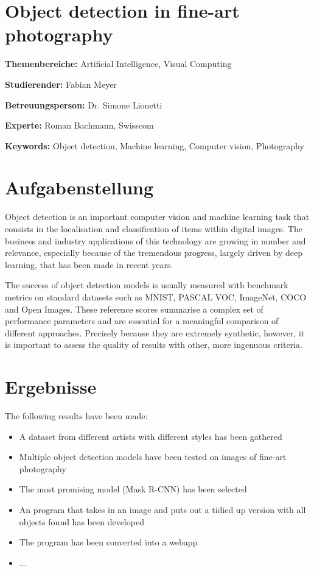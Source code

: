 \documentclass[a4paper,10pt,hidelinks]{scrartcl}
\begin{document}
\section*{\fontsize{18}{20}\selectfont Object detection in fine-art photography}
\thispagestyle{firstpage}

\textbf{Themenbereiche:} \tabto{4cm} Artificial Intelligence, Visual Computing

\noindent
\textbf{Studierender:} \tabto{4cm} Fabian Meyer

\noindent
\textbf{Betreuungsperson:} \tabto{4cm} Dr. Simone Lionetti

\noindent
\textbf{Experte:} \tabto{4cm} Roman Bachmann, Swisscom

\noindent
\textbf{Keywords:} \tabto{4cm} Object detection, Machine learning, Computer vision, Photography

\section{\fontsize{14}{16}\selectfont Aufgabenstellung}

Object detection is an important computer vision and machine learning task that consists in the localisation and classification of items within digital images. The business and industry applications of this technology are growing in number and relevance, especially because of the tremendous progress, largely driven by deep learning, that has been made in recent years.

The success of object detection models is usually measured with benchmark metrics on standard datasets such as MNIST, PASCAL VOC, ImageNet, COCO and Open Images. These reference scores summarise a complex set of performance parameters and are essential for a meaningful comparison of different approaches. Precisely because they are extremely synthetic, however, it is important to assess the quality of results with other, more ingenuous criteria.

\section{\fontsize{14}{16}\selectfont Ergebnisse}

The following results have been made:

\begin{itemize}
	\item A dataset from different artists with different styles has been gathered
	\item Multiple object detection models have been tested on images of fine-art photography
	\item The most promising model (Mask R-CNN) has been selected
	\item An program that takes in an image and puts out a tidied up version with all objects found has been developed
	\item The program has been converted into a webapp
	\item ...
\end{itemize}
\end{document}
